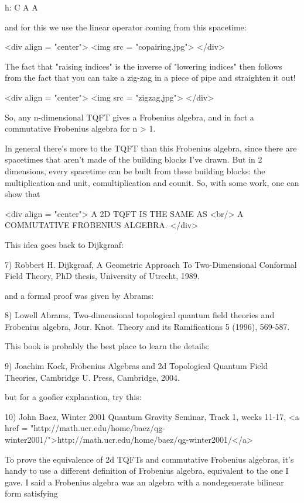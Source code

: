 h: C \to  A \otimes  A

and for this we use the linear operator coming from this spacetime:

<div align = "center">
<img src = "copairing.jpg">
</div>

The fact that "raising indices" is the inverse of "lowering
indices" then follows from the fact that you can take a zig-zag
in a piece of pipe and straighten it out!

<div align = "center">
<img src = "zigzag.jpg">
</div>


So, any n-dimensional TQFT gives a Frobenius algebra, and in
fact a commutative Frobenius algebra for n > 1.  

In general there's more to the TQFT than this Frobenius algebra, 
since there are spacetimes that aren't made of the building 
blocks I've drawn.  But in 2 dimensions, every spacetime can be 
built from these building blocks: the multiplication and unit, 
comultiplication and counit.  So, with some work, one can show that

<div align = "center">
                  A 2D TQFT IS THE SAME AS <br/>
              A COMMUTATIVE FROBENIUS ALGEBRA.
</div>
 
This idea goes back to Dijkgraaf:

7) Robbert H. Dijkgraaf, A Geometric Approach To Two-Dimensional 
Conformal Field Theory, PhD thesis, University of Utrecht, 1989.

and a formal proof was given by Abrams:

8) Lowell Abrams, Two-dimensional topological quantum field theories
and Frobenius algebra, Jour. Knot. Theory and its Ramifications 5
(1996), 569-587.

This book is probably the best place to learn the details:

9) Joachim Kock, Frobenius Algebras and 2d Topological Quantum 
Field Theories, Cambridge U. Press, Cambridge, 2004.

but for a goofier explanation, try this:

10) John Baez, Winter 2001 Quantum Gravity Seminar, Track 1,
weeks 11-17, <a href = "http://math.ucr.edu/home/baez/qg-winter2001/">http://math.ucr.edu/home/baez/qg-winter2001/</a>

To prove the equivalence of 2d TQFTs and commutative Frobenius 
algebras, it's handy to use a different definition of Frobenius 
algebra, equivalent to the one I gave.  I said a Frobenius algebra 
was an algebra with a nondegenerate bilinear form satisfying 

